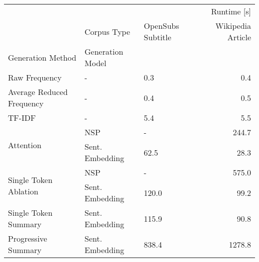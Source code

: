 \begin{tabular}{lllr}
\toprule
 &  & \multicolumn{2}{r}{Runtime [s]} \\
 & Corpus Type & OpenSubs Subtitle & Wikipedia Article \\
Generation Method & Generation Model &  &  \\
\midrule
Raw Frequency & - & 0.3 & 0.4 \\
\cline{1-4}
Average Reduced Frequency & - & 0.4 & 0.5 \\
\cline{1-4}
TF-IDF & - & 5.4 & 5.5 \\
\cline{1-4}
\multirow[t]{2}{*}{Attention} & NSP & - & 244.7 \\
 & Sent. Embedding & 62.5 & 28.3 \\
\cline{1-4}
\multirow[t]{2}{*}{Single Token Ablation} & NSP & - & 575.0 \\
 & Sent. Embedding & 120.0 & 99.2 \\
\cline{1-4}
Single Token Summary & Sent. Embedding & 115.9 & 90.8 \\
\cline{1-4}
Progressive Summary & Sent. Embedding & 838.4 & 1278.8 \\
\cline{1-4}
\bottomrule
\end{tabular}
